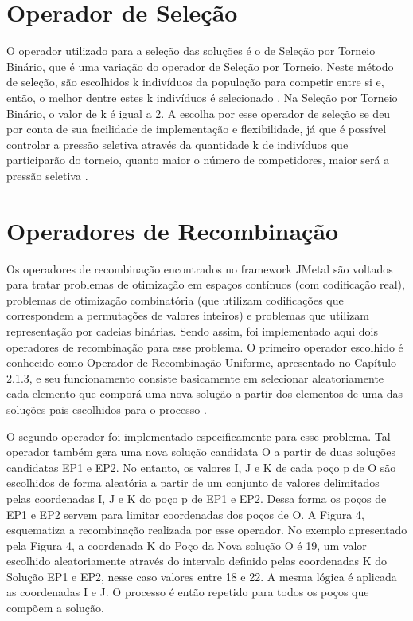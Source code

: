 \section{Operador de Seleção}

O operador utilizado para a seleção das soluções é o de Seleção por Torneio Binário, que é uma variação do operador de Seleção por Torneio. Neste método de seleção, são escolhidos k indivíduos da população para competir entre si e, então, o melhor dentre estes k indivíduos é selecionado \cite{Kacprzyk2015}. Na Seleção por Torneio Binário, o valor de k é igual a 2. A escolha por esse operador de seleção se deu por conta de sua facilidade de implementação e flexibilidade, já que é possível controlar a pressão seletiva através da quantidade k de indivíduos que participarão do torneio, quanto maior o número de competidores, maior será a pressão seletiva \cite{Miller1995}.

\section{Operadores de Recombinação}

Os operadores de recombinação encontrados no framework JMetal são voltados para tratar problemas de otimização em espaços contínuos (com codificação real), problemas de otimização combinatória (que utilizam codificações que correspondem a permutações de valores inteiros) e problemas que utilizam representação por cadeias binárias. Sendo assim, foi implementado aqui dois operadores de recombinação para esse problema. O primeiro operador escolhido é conhecido como Operador de Recombinação Uniforme, apresentado no Capítulo 2.1.3, e seu funcionamento consiste basicamente em selecionar aleatoriamente cada elemento que comporá uma nova solução a partir dos elementos de uma das soluções pais escolhidos para o processo \cite{Talbi2009, Kacprzyk2015}.

O segundo operador foi implementado especificamente para esse problema.  Tal operador também gera uma nova solução candidata O a partir de duas soluções candidatas EP1 e EP2. No entanto, os valores I, J e K de cada poço p de O são escolhidos de forma aleatória a partir de um conjunto de valores delimitados pelas coordenadas I, J e K do poço p de EP1 e EP2. Dessa forma os poços de EP1 e EP2 servem para limitar coordenadas dos poços de O. A Figura 4, esquematiza a recombinação realizada por esse operador. No exemplo apresentado pela Figura 4, a coordenada K do Poço da Nova solução O é 19, um valor escolhido aleatoriamente através do intervalo definido pelas coordenadas K do Solução EP1 e EP2, nesse caso valores entre 18 e 22. A mesma lógica é aplicada as coordenadas I e J. O processo é então repetido para todos os poços que compõem a solução.

